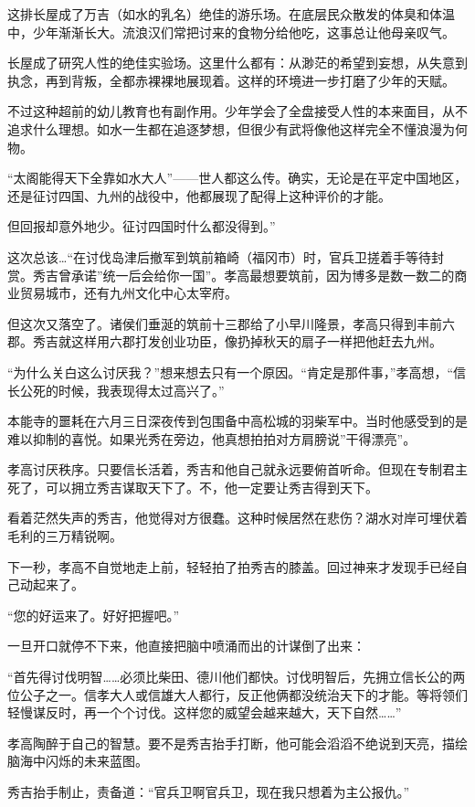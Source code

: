 \documentclass[
]{article}
\begin{document}
这排长屋成了万吉（如水的乳名）绝佳的游乐场。在底层民众散发的体臭和体温中，少年渐渐长大。流浪汉们常把讨来的食物分给他吃，这事总让他母亲叹气。

长屋成了研究人性的绝佳实验场。这里什么都有：从渺茫的希望到妄想，从失意到执念，再到背叛，全都赤裸裸地展现着。这样的环境进一步打磨了少年的天赋。

不过这种超前的幼儿教育也有副作用。少年学会了全盘接受人性的本来面目，从不追求什么理想。如水一生都在追逐梦想，但很少有武将像他这样完全不懂浪漫为何物。

``太阁能得天下全靠如水大人''------世人都这么传。确实，无论是在平定中国地区，还是征讨四国、九州的战役中，他都展现了配得上这种评价的才能。

但回报却意外地少。征讨四国时什么都没得到。''

这次总该\ldots{}``在讨伐岛津后撤军到筑前箱崎（福冈市）时，官兵卫搓着手等待封赏。秀吉曾承诺''统一后会给你一国''。孝高最想要筑前，因为博多是数一数二的商业贸易城市，还有九州文化中心太宰府。

但这次又落空了。诸侯们垂涎的筑前十三郡给了小早川隆景，孝高只得到丰前六郡。秀吉就这样用六郡打发创业功臣，像扔掉秋天的扇子一样把他赶去九州。

``为什么关白这么讨厌我？''想来想去只有一个原因。``肯定是那件事，''孝高想，``信长公死的时候，我表现得太过高兴了。''

本能寺的噩耗在六月三日深夜传到包围备中高松城的羽柴军中。当时他感受到的是难以抑制的喜悦。如果光秀在旁边，他真想拍拍对方肩膀说''干得漂亮''。

孝高讨厌秩序。只要信长活着，秀吉和他自己就永远要俯首听命。但现在专制君主死了，可以拥立秀吉谋取天下了。不，他一定要让秀吉得到天下。

看着茫然失声的秀吉，他觉得对方很蠢。这种时候居然在悲伤？湖水对岸可埋伏着毛利的三万精锐啊。

下一秒，孝高不自觉地走上前，轻轻拍了拍秀吉的膝盖。回过神来才发现手已经自己动起来了。

``您的好运来了。好好把握吧。''

一旦开口就停不下来，他直接把脑中喷涌而出的计谋倒了出来：

``首先得讨伐明智\ldots\ldots 必须比柴田、德川他们都快。讨伐明智后，先拥立信长公的两位公子之一。信孝大人或信雄大人都行，反正他俩都没统治天下的才能。等将领们轻慢谋反时，再一个个讨伐。这样您的威望会越来越大，天下自然\ldots\ldots{}''

孝高陶醉于自己的智慧。要不是秀吉抬手打断，他可能会滔滔不绝说到天亮，描绘脑海中闪烁的未来蓝图。

秀吉抬手制止，责备道：``官兵卫啊官兵卫，现在我只想着为主公报仇。''
\end{document}
